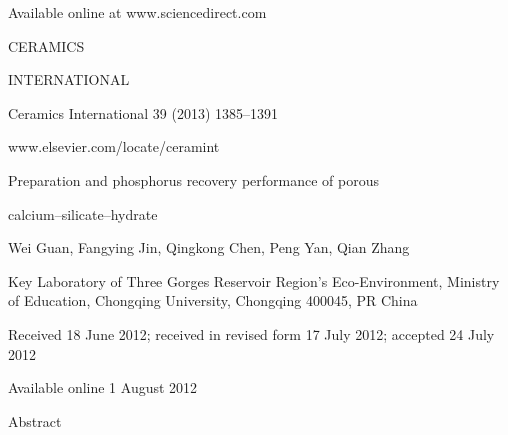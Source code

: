 \documentclass[a4paper,portrait,12pt]{article}
\begin{document}
\begin{flushleft}
Available online at www.sciencedirect.com
\end{flushleft}





\begin{flushleft}
CERAMICS
\end{flushleft}


\begin{flushleft}
INTERNATIONAL
\end{flushleft}





\begin{flushleft}
Ceramics International 39 (2013) 1385--1391
\end{flushleft}


\begin{flushleft}
www.elsevier.com/locate/ceramint
\end{flushleft}





\begin{flushleft}
Preparation and phosphorus recovery performance of porous
\end{flushleft}


\begin{flushleft}
calcium--silicate--hydrate
\end{flushleft}


\begin{flushleft}
Wei Guan, Fangying Jin, Qingkong Chen, Peng Yan, Qian Zhang
\end{flushleft}


\begin{flushleft}
Key Laboratory of Three Gorges Reservoir Region's Eco-Environment, Ministry of Education, Chongqing University, Chongqing 400045, PR China
\end{flushleft}


\begin{flushleft}
Received 18 June 2012; received in revised form 17 July 2012; accepted 24 July 2012
\end{flushleft}


\begin{flushleft}
Available online 1 August 2012
\end{flushleft}





\begin{flushleft}
Abstract
\end{flushleft}
\end{document}
